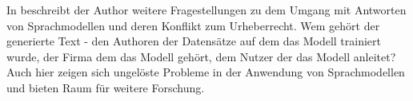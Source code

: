 In \citet{plagiarism} beschreibt der Author weitere Fragestellungen zu dem Umgang mit Antworten von Sprachmodellen und deren Konflikt zum Urheberrecht.
Wem gehört der generierte Text - den Authoren der Datensätze auf dem das Modell trainiert wurde, der Firma dem das Modell gehört, dem Nutzer der das Modell anleitet? 
Auch hier zeigen sich  ungelöste Probleme in der Anwendung von Sprachmodellen und bieten Raum für weitere Forschung.\\
